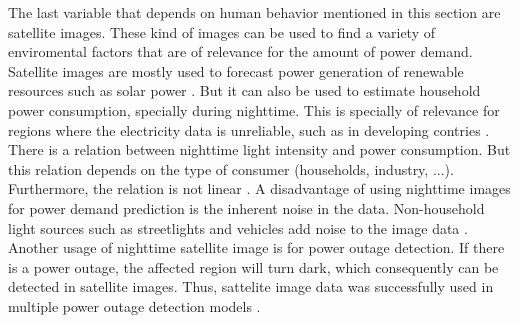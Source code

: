 The last variable that depends on human behavior mentioned in this section are
satellite images. These kind of images can be used to find a variety 
of enviromental factors that are of relevance for the amount of power demand.
Satellite images are mostly used to forecast power generation of 
renewable resources such as solar power \cite{solarprediction}.
But it can also be used to estimate household power consumption,
specially during nighttime. This is specially of relevance for regions 
where the electricity data is unreliable, such as in developing contries
\cite{reviewnighttime}. There is a relation 
between nighttime light intensity and power consumption.
But this relation depends on the type of consumer 
(households, industry, ...). Furthermore, the relation is not linear
\cite{nighttimepowerestimation}. 
A disadvantage of using nighttime images for power demand prediction is 
the inherent noise in the data. Non-household light sources such as 
streetlights and vehicles add noise to the image data \cite{reviewnighttime}.
Another usage of nighttime satellite image is for power outage detection.
If there is a power outage, the affected region will turn dark, which 
consequently can be detected in satellite images. Thus, sattelite image data 
was successfully used in multiple power outage detection models
\cite{nightpoweroutage} \cite{twitterpoweroutagelighttime}.
